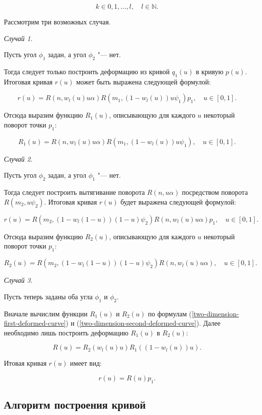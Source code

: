 $$
k \in {0,1,\dots,l}, \quad l \in \mathbb{N}.
$$

Рассмотрим три возможных случая.

\bigskip
\textit{Случай 1.}

Пусть угол $\phi_1$ задан, а угол $\phi_2$ "--- нет.

Тогда следует только построить деформацию из кривой $q_1(u)$ в кривую $p(u)$. Итоговая кривая $r(u)$ может быть
выражена следующей формулой:

$$
r(u)=R(n,w_l(u)u\alpha)R(m_1,(1-w_l(u))u\psi_1)p_1, \quad u \in [0,1].
$$

Отсюда выразим функцию $R_1(u)$, описывающую для каждого $u$ некоторый поворот точки $p_1$:

\begin{equation}
R_1(u)=R(n,w_l(u)u\alpha)R(m_1,(1-w_l(u))u\psi_1), \quad u \in [0,1].
\label{two-dimension-first-deformed-curve}
\end{equation}

\bigskip
\textit{Случай 2.}

Пусть угол $\phi_2$ задан, а угол $\phi_1$ "--- нет.

Тогда следует построить вытягивание поворота $R(n,u\alpha)$ посредством поворота $R(m_2,u\psi_2)$. Итоговая кривая
$r(u)$ будет выражена следующей формулой:

$$
r(u)=R(m_2,(1-w_l(1-u))(1-u)\psi_2)R(n,w_l(u)u\alpha)p_1, \quad u \in [0,1].
$$

Отсюда выразим функцию $R_2(u)$, описывающую для каждого $u$ некоторый поворот точки $p_1$:

\begin{equation}
R_2(u)=R(m_2,(1-w_l(1-u))(1-u)\psi_2)R(n,w_l(u)u\alpha), \quad u \in [0,1].
\label{two-dimension-second-deformed-curve}
\end{equation}

\bigskip
\textit{Случай 3.}

Пусть теперь заданы оба угла $\phi_1$ и $\phi_2$.

Вначале вычислим функции $R_1(u)$ и $R_2(u)$ по формулам (\ref{two-dimension-first-deformed-curve}) и
(\ref{two-dimension-second-deformed-curve}). Далее необходимо лишь построить деформацию $R_1(u)$ в $R_2(u)$:

$$
R(u)=R_2(w_l(u)u)R_1((1-w_l(u))u).
$$

Итовая кривая $r(u)$ имеет вид:

$$
r(u)=R(u)p_1.
$$

\subsection*{Алгоритм построения кривой}

